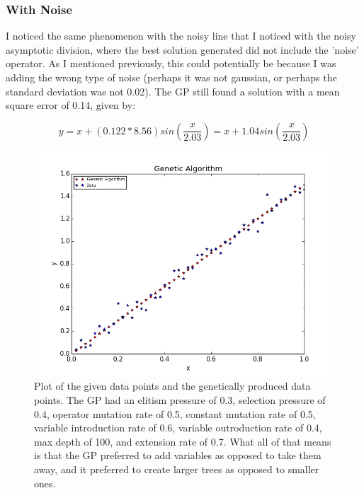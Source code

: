 \documentclass[11pt,amsmath,amssymb]{revtex4}
\begin{document}
\subsubsection{With Noise}
I noticed the same phenomenon with the noisy line that I noticed with the noisy asymptotic division, where the best solution generated did not include the 'noise' operator. As I mentioned previously, this could potentially be because I was adding the wrong type of noise (perhaps it was not gaussian, or perhaps the standard deviation was not 0.02). The GP still found a solution with a mean square error of 0.14, given by:

\begin{equation}
y = x+(0.122*8.56)sin(\frac{x}{2.03}) = x+1.04sin(\frac{x}{2.03})
\end{equation}

\begin{figure}[H]
\center
\includegraphics[scale=0.55]{Line_With_Noise.png}
\caption{Plot of the given data points and the genetically produced data points. The GP had an elitism pressure of 0.3, selection pressure of 0.4, operator mutation rate of 0.5, constant mutation rate of 0.5, variable introduction rate of 0.6, variable outroduction rate of 0.4, max depth of 100, and extension rate of 0.7. What all of that means is that the GP preferred to add variables as opposed to take them away, and it preferred to create larger trees as opposed to smaller ones.}
\label{q1}
\end{figure}
\end{document}
